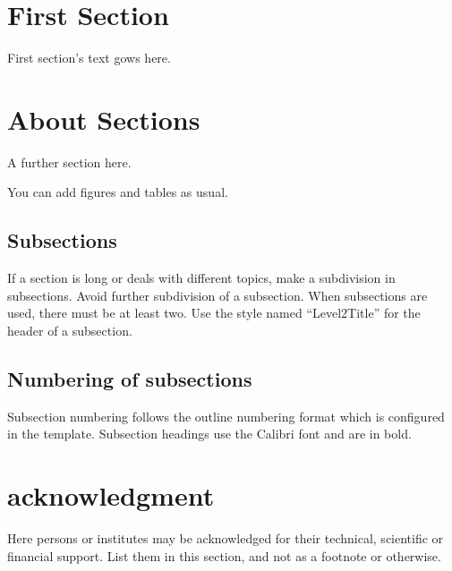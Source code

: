 \documentclass[article]{imeko_acta}
\begin{document}
\section{First Section}

First section's text gows here.

\section{About Sections}

A further section here.

You can add figures and tables as usual.


	

\subsection{Subsections} \label{sec:sub1}

If a section is long or deals with different topics, make a subdivision in subsections. Avoid further subdivision of a subsection. When subsections are used, there must be at least two. Use the style named ``Level2Title'' for the header of a subsection.

\subsection{Numbering of subsections}

Subsection numbering follows the outline numbering format which is configured in the template. Subsection headings use the Calibri font and are in bold.

\section*{acknowledgment} 

Here persons or institutes may be acknowledged for their technical, scientific or financial support. List them in this section, and not as a footnote or otherwise.

\nocite{*}


\end{document}

